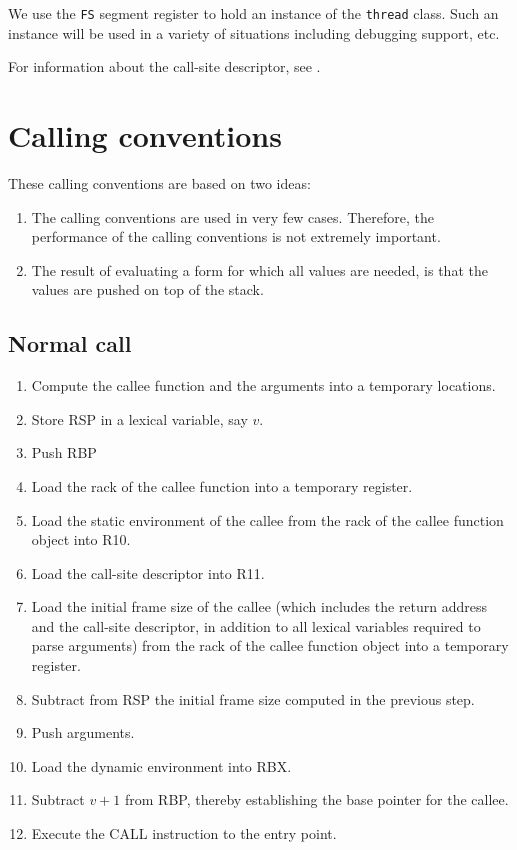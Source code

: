 We use the \texttt{FS} segment register to hold an instance of the
\texttt{thread} class.  Such an instance will be used in a variety of
situations including debugging support, etc.

For information about the call-site descriptor, see
.


\section{Calling conventions}

These calling conventions are based on two ideas:

\begin{enumerate}
\item The calling conventions are used in very few cases.  Therefore,
  the performance of the calling conventions is not extremely
  important.
\item The result of evaluating a form for which all values are needed,
  is that the values are pushed on top of the stack.
\end{enumerate}

\subsection{Normal call}

\begin{enumerate}
\item Compute the callee function and the arguments into a temporary
  locations.
\item Store RSP in a lexical variable, say $v$.
\item Push RBP
\item Load the rack of the callee function into a temporary register.
\item Load the static environment of the callee from the rack of the
  callee function object into R10.
\item Load the call-site descriptor into R11.
\item Load the initial frame size of the callee (which
  includes the return address and the call-site descriptor, in
  addition to all lexical variables required to parse arguments) from
  the rack of the callee function object into a temporary register.
\item Subtract from RSP the initial frame size computed in the
  previous step.
\item Push arguments.
\item Load the dynamic environment into RBX.
\item Subtract $v+1$ from RBP, thereby establishing the base pointer
  for the callee.
\item Execute the CALL instruction to the entry point.
\end{enumerate}

